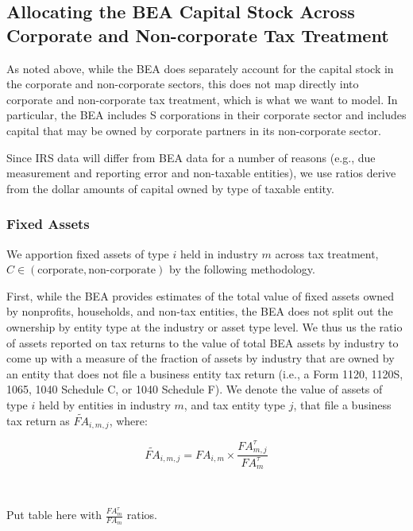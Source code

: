 \documentclass[article,11pt,letterpaper,fleqn]{article}
\theoremstyle{definition}
\numberwithin{equation}{section}
\begin{document}
\subsection{Allocating the BEA Capital Stock Across Corporate and Non-corporate Tax Treatment} 

As noted above, while the BEA does separately account for the capital stock in the corporate and non-corporate sectors, this does not map directly into corporate and non-corporate tax treatment, which is what we want to model.  In particular, the BEA includes S corporations in their corporate sector and includes capital that may be owned by corporate partners in its non-corporate sector.  

Since IRS data will differ from BEA data for a number of reasons (e.g., due measurement and reporting error and non-taxable entities), we use ratios derive from the dollar amounts of capital owned by type of taxable entity. 

\subsubsection{Fixed Assets}
We apportion fixed assets of type $i$ held in industry $m$ across tax treatment, $C\in(\text{corporate},\text{non-corporate})$ by the following methodology.

First, while the BEA provides estimates of the total value of fixed assets owned by nonprofits, households, and non-tax entities, the BEA does not split out the ownership by entity type at the industry or asset type level.  We thus us the ratio of assets reported on tax returns to the value of total BEA assets by industry to come up with a measure of the fraction of assets by industry that are owned by an entity that does not file a business entity tax return (i.e., a Form 1120, 1120S, 1065, 1040 Schedule C, or 1040 Schedule F).  We denote the value of assets of type $i$ held by entities in industry $m$, and tax entity type $j$, that file a business tax return as $\widetilde{FA}_{i,m,j}$, where:

\begin{equation}
\widetilde{FA}_{i,m,j}={FA}_{i,m}\times \frac{{FA}^{\tau}_{m,j}}{{FA}^{\tau}_{m}}
\end{equation}

\ \\
\begin{center}
Put table here with $\frac{{FA}^{\tau}_{m}}{{FA}_{m}}$ ratios.
\end{center}
\ \\
\end{document}
